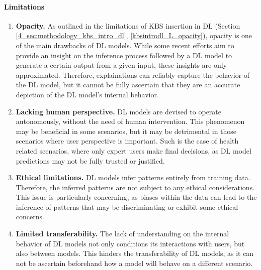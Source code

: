 \paragraph{Limitations}
\begin{enumerate} [start=1,label={\bfseries L\arabic*.}]
    \item \textbf{Opacity.} \label{kbsextradl_L_opacity} As outlined in the limitations of KBS insertion in DL (Section \ref{4_sec:methodology_kbs_intro_dl}, \ref{kbsintrodl_L_opacity}), opacity is one of the main drawbacks of DL models. While some recent efforts aim to provide an insight on the inference process followed by a DL model to generate a certain output from a given input, these insights are only approximated. Therefore, explainations can reliably capture the behavior of the DL model, but it cannot be fully ascertain that they are an accurate depiction of the DL model's internal behavior.

    \item \textbf{Lacking human perspective.} \label{kbsextradl_L_human} DL models are devised to operate autonomously, without the need of human intervention. This phenomenon may be beneficial in some scenarios, but it may be detrimental in those scenarios where user perspective is important. Such is the case of health related scenarios, where only expert users make final decisions, as DL model predictions may not be fully trusted or justified. 
    
    \item \textbf{Ethical limitations.} \label{kbsextradl_L_ethical} DL models infer patterns entirely from training data. Therefore, the inferred patterns are not subject to any ethical considerations. This issue is particularly concerning, as biases within the data can lead to the inference of patterns that may be discriminating or exhibit some ethical concerns.
    
    \item \textbf{Limited transferability.}\label{kbsextradl_L_transferability} The lack of understanding on the internal behavior of DL models not only conditions its interactions with users, but also between models. This hinders the transferability of DL models, as it can not be ascertain beforehand how a model will behave on a different scenario.
\end{enumerate}

